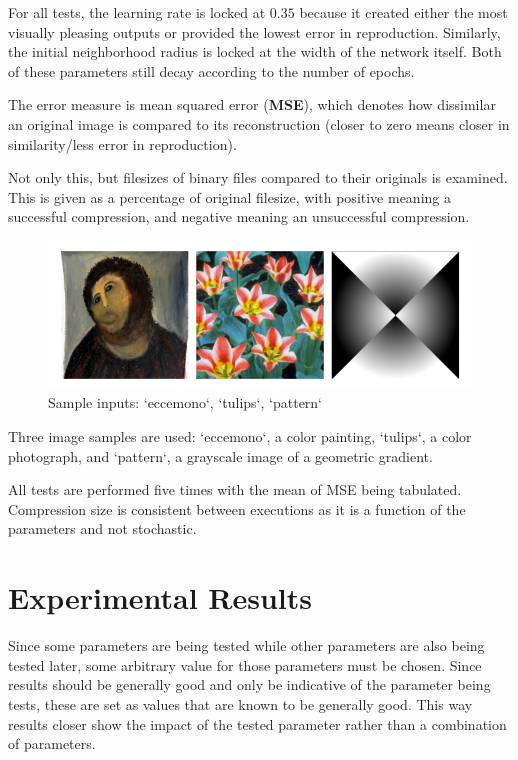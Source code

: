 \documentclass[a4paper,12pt]{article}
\begin{document}
For all tests, the learning rate is locked at $0.35$ because it created either the most visually pleasing outputs or provided the lowest error in reproduction. Similarly, the initial neighborhood radius is locked at the width of the network itself. Both of these parameters still decay according to the number of epochs.

The error measure is mean squared error (\textbf{MSE}), which denotes how dissimilar an original image is compared to its reconstruction (closer to zero means closer in similarity/less error in reproduction). 

Not only this, but filesizes of binary files compared to their originals is examined. This is given as a percentage of original filesize, with positive meaning a successful compression, and negative meaning an unsuccessful compression.

\begin{figure}[h!]
\centering
\includegraphics[scale=0.50]{images/images.png}
\caption{Sample inputs: `eccemono`, `tulips`, `pattern`}
\label{fig:images}
\end{figure}

Three image samples are used: `eccemono`, a color painting, `tulips`, a color photograph, and `pattern`, a grayscale image of a geometric gradient.

All tests are performed five times with the mean of MSE being tabulated. Compression size is consistent between executions as it is a function of the parameters and not stochastic.

\section{Experimental Results}

Since some parameters are being tested while other parameters are also being tested later, some arbitrary value for those parameters must be chosen. Since results should be generally good and only be indicative of the parameter being tests, these are set as values that are known to be generally good. This way results closer show the impact of the tested parameter rather than a combination of parameters.
\end{document}
